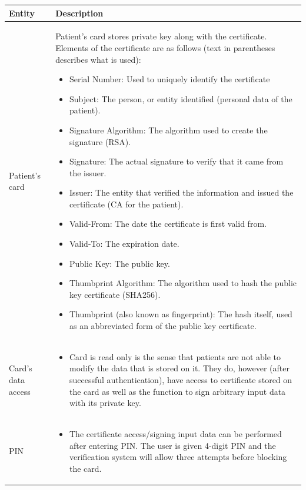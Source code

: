 \documentclass[12pt,titlepage]{article}
\begin{document}
\begin{tabularx}{\textwidth}{ |p{2.5cm}|X| }
	\hline
	\textbf{Entity} &  \textbf{Description}\\
	\hline	
Patient's card & Patient's card stores private key along with the certificate. Elements of the certificate are as follows (text in parentheses describes what is used): 
\begin{itemize}
\item Serial Number: Used to uniquely identify the certificate
\item Subject: The person, or entity identified (personal data of the patient).
\item Signature Algorithm: The algorithm used to create the signature (RSA).
\item Signature: The actual signature to verify that it came from the issuer.
\item Issuer: The entity that verified the information and issued the certificate (CA for the patient).
\item Valid-From: The date the certificate is first valid from.
\item Valid-To: The expiration date.
\item Public Key: The public key.
\item Thumbprint Algorithm: The algorithm used to hash the public key certificate (SHA256).
\item Thumbprint (also known as fingerprint): The hash itself, used as an abbreviated form of the public key certificate.
\end{itemize} \\
\hline
	
Card's data \newline access &
\begin{itemize}
\item 
Card is read only is the sense that patients are not able to modify the data that is stored on it. They do, however (after successful authentication), have access to certificate stored on the card as well as the function to sign arbitrary input data with its private key.
\end{itemize} \\
\hline

PIN &
\begin{itemize}
\item The certificate access/signing input data can be performed after entering PIN. The user is given 4-digit PIN and the verification system will allow three attempts before blocking the card.
\end{itemize} \\
\hline
\end{tabularx}
\end{document}
